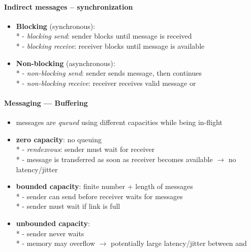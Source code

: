 \paragraph{Indirect messages -- synchronization}
\begin{itemize}
  \item \textbf{Blocking} (synchronous): \\*
    - \emph{blocking send}: sender blocks until message is received \\*
    - \emph{blocking receive}: receiver blocks until message is available
  \item \textbf{Non-blocking} (asynchronous): \\*
    - \emph{non-blocking send}: sender sends message, then continues \\*
    - \emph{non-blocking receive}: receiver receives valid message or 
\end{itemize}

\paragraph{Messaging --- Buffering}
\begin{itemize}
  \item messages are \emph{queued} using different capacities while being in-flight
  \item \textbf{zero capacity}: no queuing \\*
    - \emph{rendezvous}: sender must wait for receiver \\*
    - message is transferred as soon as receiver becomes available \( \to \) no latency/jitter
  \item \textbf{bounded capacity}: finite number + length of messages \\*
    - sender can send before receiver waits for messages \\*
    - sender must wait if link is full
  \item \textbf{unbounded capacity}: \\*
    - sender never waits \\*
    - memory may overflow \( \to \) potentially large latency/jitter between  and 
\end{itemize}

